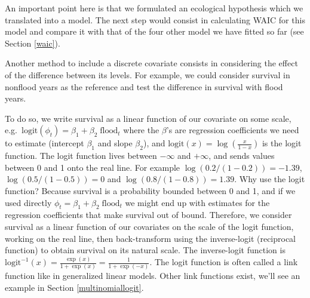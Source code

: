 \documentclass[
  12pt,
]{krantz}
\newenvironment{Shaded}{\begin{snugshade}}{\end{snugshade}}
\newcommand{\DecValTok}[1]{\textcolor[rgb]{0.00,0.00,0.81}{#1}}
\newcommand{\DocumentationTok}[1]{\textcolor[rgb]{0.56,0.35,0.01}{\textbf{\textit{#1}}}}
\newcommand{\FunctionTok}[1]{\textcolor[rgb]{0.13,0.29,0.53}{\textbf{#1}}}
\newcommand{\NormalTok}[1]{#1}
\newcommand{\OtherTok}[1]{\textcolor[rgb]{0.56,0.35,0.01}{#1}}
\newcommand{\SpecialCharTok}[1]{\textcolor[rgb]{0.81,0.36,0.00}{\textbf{#1}}}
\newcommand{\StringTok}[1]{\textcolor[rgb]{0.31,0.60,0.02}{#1}}
\begin{document}
\begin{Shaded}
\end{Shaded}

An important point here is that we formulated an ecological hypothesis which we translated into a model. The next step would consist in calculating WAIC for this model and compare it with that of the four other model we have fitted so far (see Section \ref{waic}).

Another method to include a discrete covariate consists in considering the effect of the difference between its levels. For example, we could consider survival in nonflood years as the reference and test the difference in survival with flood years.

To do so, we write survival as a linear function of our covariate on some scale, e.g.~\(\text{logit}(\phi_t) = \beta_1 + \beta_2 \;\text{flood}_t\) where the \(\beta\)'s are regression coefficients we need to estimate (intercept \(\beta_1\) and slope \(\beta_2\)), and \(\text{logit}(x) = \log \displaystyle{\left(\frac{x}{1-x}\right)}\) is the logit function. The logit function lives between \(-\infty\) and \(+\infty\), and sends values between 0 and 1 onto the real line. For example \(\log(0.2/(1-0.2))=-1.39\), \(\log(0.5/(1-0.5))=0\) and \(\log(0.8/(1-0.8))=1.39\). Why use the logit function? Because survival is a probability bounded between 0 and 1, and if we used directly \(\phi_t = \beta_1 + \beta_2 \;\text{flood}_t\) we might end up with estimates for the regression coefficients that make survival out of bound. Therefore, we consider survival as a linear function of our covariates on the scale of the logit function, working on the real line, then back-transform using the inverse-logit (reciprocal function) to obtain survival on its natural scale. The inverse-logit function is \(\displaystyle{\text{logit}^{-1}(x) = \frac{\exp(x)}{1+\exp(x)} = \frac{1}{1+\exp(-x)}}\). The logit function is often called a link function like in generalized linear models. Other link functions exist, we'll see an example in Section \ref{multinomiallogit}.
\end{document}
